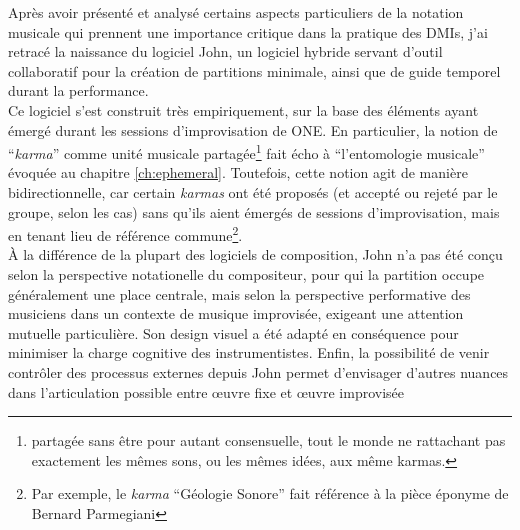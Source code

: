 \noindent Après avoir présenté et analysé certains aspects particuliers de la notation musicale qui prennent une importance critique dans la pratique des \glspl{DMI}, j'ai retracé la naissance du logiciel John, un logiciel hybride servant d'outil collaboratif pour la création de partitions minimale, ainsi que de guide temporel durant la performance.\\
\indent Ce logiciel s'est construit très empiriquement, sur la base des éléments ayant émergé durant les sessions d'improvisation de ONE. En particulier, la notion de ``\textit{karma}'' comme unité musicale partagée\footnote{partagée sans être pour autant consensuelle, tout le monde ne rattachant pas exactement les mêmes sons, ou les mêmes idées, aux même karmas.} fait écho à ``l'entomologie musicale'' évoquée au chapitre \ref{ch:ephemeral}. Toutefois, cette notion agit de manière bidirectionnelle, car certain \textit{karmas} ont été proposés (et accepté ou rejeté par le groupe, selon les cas) sans qu'ils aient émergés de sessions d'improvisation, mais en tenant lieu de référence commune\footnote{Par exemple, le \textit{karma} ``Géologie Sonore'' fait référence à la pièce éponyme de Bernard Parmegiani}.\\
\indent À la différence de la plupart des logiciels de composition, John n'a pas été conçu selon la perspective notationelle du compositeur, pour qui la partition occupe généralement une place centrale, mais selon la perspective performative des musiciens dans un contexte de musique improvisée, exigeant une attention mutuelle particulière. Son design visuel a été adapté en conséquence pour minimiser la charge cognitive des instrumentistes. Enfin, la possibilité de venir contrôler des processus externes depuis John permet d'envisager d'autres nuances dans l'articulation possible entre œuvre fixe et œuvre improvisée






